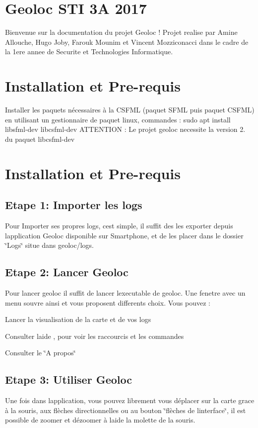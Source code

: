 \hypertarget{index_intro_sec}{}\section{Geoloc S\+T\+I 3\+A 2017}\label{index_intro_sec}
Bienvenue sur la documentation du projet Geoloc ! Projet realise par Amine Allouche, Hugo Joby, Farouk Mounim et Vincent Mozziconacci dans le cadre de la 1ere annee de Securite et Technologies Informatique. \hypertarget{index_install_sec}{}\section{Installation et Pre-\/requis}\label{index_install_sec}
Installer les paquets nécessaires à la C\+S\+F\+ML (paquet S\+F\+ML puis paquet C\+S\+F\+ML) en utilisant un gestionnaire de paquet linux, commandes \+: sudo apt install libsfml-\/dev libcsfml-\/dev A\+T\+T\+E\+N\+T\+I\+ON \+: Le projet geoloc necessite la version 2. du paquet libcsfml-\/dev\hypertarget{index_install_sec}{}\section{Installation et Pre-\/requis}\label{index_install_sec}
\hypertarget{index_step1}{}\subsection{Etape 1\+: Importer les logs}\label{index_step1}
Pour Importer ses propres logs, c\textquotesingle{}est simple, il suffit des les exporter depuis l\textquotesingle{}application Geoloc disponible sur Smartphone, et de les placer dans le dossier \char`\"{}\+Logs\char`\"{} situe dans geoloc/logs.\hypertarget{index_step2}{}\subsection{Etape 2\+: Lancer Geoloc}\label{index_step2}
Pour lancer geoloc il suffit de lancer l\textquotesingle{}executable de geoloc. Une fenetre avec un menu s\textquotesingle{}ouvre ainsi et vous proposent differents choix. Vous pouvez \+:
\begin{DoxyItemize}
\item Lancer la visualisation de la carte et de vos logs
\item Consulter l\textquotesingle{}aide , pour voir les raccourcis et les commandes
\item Consulter le \char`\"{}\+A propos\char`\"{}
\end{DoxyItemize}\hypertarget{index_step3}{}\subsection{Etape 3\+: Utiliser Geoloc}\label{index_step3}
Une fois dans l\textquotesingle{}application, vous pouvez librement vous déplacer sur la carte grace à la souris, aux flèches directionnelles ou au bouton \char`\"{}flèches de l\textquotesingle{}interface\char`\"{}, il est possible de zoomer et dézoomer à l\textquotesingle{}aide la molette de la souris.

